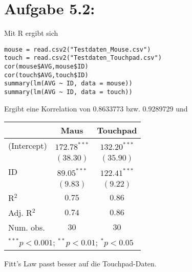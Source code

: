 \documentclass{article}
\begin{document}
	\section*{Aufgabe 5.2: }
	Mit R ergibt sich
	\begin{lstlisting}[style=R]
mouse = read.csv2("Testdaten_Mouse.csv")
touch = read.csv2("Testdaten_Touchpad.csv")
cor(mouse$AVG,mouse$ID)
cor(touch$AVG,touch$ID)
summary(lm(AVG ~ ID, data = mouse))
summary(lm(AVG ~ ID, data = touch))
	\end{lstlisting}
	Ergibt eine Korrelation von 0.8633773 bzw. 0.9289729 und
	\begin{center}
\begin{tabular}{l c c}
\hline
 & Maus & Touchpad \\
\hline
(Intercept) & $172.78^{***}$ & $132.20^{***}$ \\
            & $(38.30)$      & $(35.90)$      \\
ID          & $89.05^{***}$  & $122.41^{***}$ \\
            & $(9.83)$       & $(9.22)$       \\
\hline
R$^2$       & $0.75$         & $0.86$         \\
Adj. R$^2$  & $0.74$         & $0.86$         \\
Num. obs.   & $30$           & $30$           \\
\hline
\multicolumn{3}{l}{\scriptsize{$^{***}p<0.001$; $^{**}p<0.01$; $^{*}p<0.05$}}
\end{tabular}
\end{center}
	Fitt's Law passt besser auf die Touchpad-Daten.

	
\end{document}
